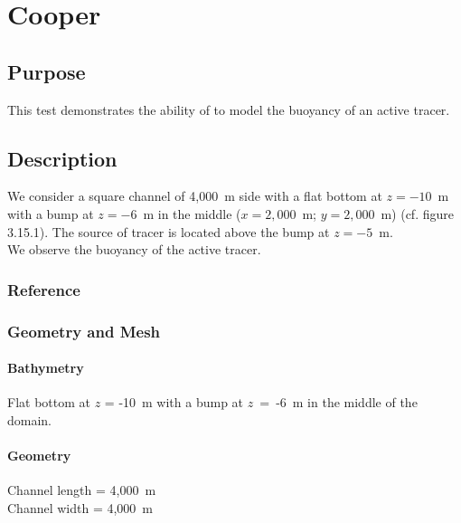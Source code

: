 \chapter{Cooper}
%
%
\section{Purpose}
%
This test demonstrates the ability of  to model the buoyancy
of an active tracer.
%
\section{Description}
%
We consider a square channel of 4,000~m side with a flat bottom at
$z = -10$~m with a bump at $z = -6$~m in the middle
($x = 2,000$~m; $y = 2,000$~m) (cf. figure 3.15.1).
The source of tracer is located above the bump at $z = -5$~m.\\
We observe the buoyancy of the active tracer.
%
%
%
%
\subsection{Reference}
%

%
%
%
\subsection{Geometry and Mesh}
%
\subsubsection{Bathymetry}
%
Flat bottom at $z$ = -10~m with a bump at $z$~=~-6~m in the middle of the domain.
%
\subsubsection{Geometry}
%
Channel length = 4,000~m\\
Channel width = 4,000~m
%
